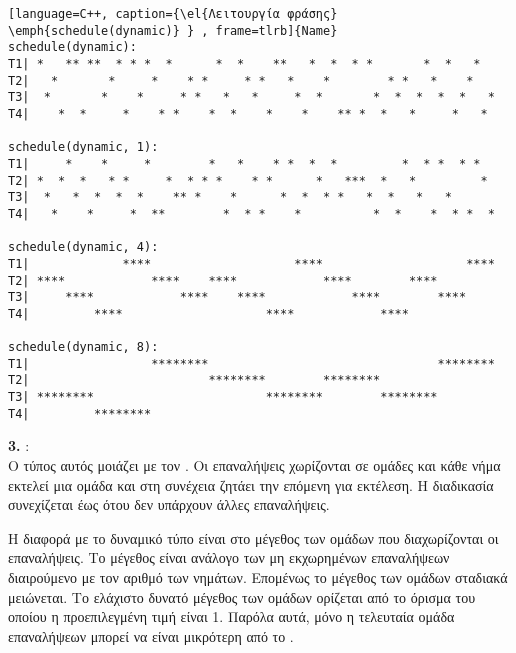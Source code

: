 \begin{spacing}{1.3}
\begin{lstlisting}[language=C++, caption={\el{Λειτουργία φράσης} \emph{schedule(dynamic)} } , frame=tlrb]{Name}
schedule(dynamic):
T1| *   ** **  * * *  *      *  *    **   *  *  * *       *  *   *  
T2|   *       *     *    * *     * *   *    *        * *   *    *   
T3|  *       *    *     * *   *   *     *  *       *  *  *  *  *   *    
T4|    *  *     *    * *    *  *    *    *    ** *  *   *     *   *                 

schedule(dynamic, 1): 
T1|     *    *     *        *   *    * *  *  *         *  * *  * *  
T2| *  *  *   * *     *  * * *    * *      *   ***  *   *         * 
T3|  *   *  *  *  *    ** *    *      *  *  * *   *  *   *   *  
T4|   *    *     *  **        *  * *    *          *  *    *  * *  *

schedule(dynamic, 4):   
T1|             ****                    ****                    ****
T2| ****            ****    ****            ****        ****        
T3|     ****            ****    ****            ****        ****    
T4|         ****                    ****            ****       

schedule(dynamic, 8):   
T1|                 ********                                ********
T2|                         ********        ********                
T3| ********                        ********        ********        
T4|         ********        
\end{lstlisting}
\end{spacing}

\clearpage
{}

\textbf{3. }: 
\ \\
Ο τύπος αυτός μοιάζει με τον \emph{}. Οι επαναλήψεις χωρίζονται σε ομάδες και κάθε νήμα εκτελεί μια ομάδα
και στη συνέχεια ζητάει την επόμενη για εκτέλεση. Η διαδικασία συνεχίζεται έως ότου δεν υπάρχουν άλλες επαναλήψεις.

Η διαφορά με το δυναμικό τύπο είναι στο μέγεθος των ομάδων που διαχωρίζονται οι επαναλήψεις. Το μέγεθος είναι ανάλογο των μη εκχωρημένων επαναλήψεων διαιρούμενο με τον αριθμό των νημάτων. Επομένως το μέγεθος των ομάδων σταδιακά μειώνεται. Το ελάχιστο δυνατό μέγεθος των ομάδων ορίζεται από το όρισμα \emph{} του οποίου η προεπιλεγμένη τιμή είναι 1. Παρόλα αυτά, μόνο η τελευταία ομάδα επαναλήψεων μπορεί να είναι μικρότερη από το \emph{}.

